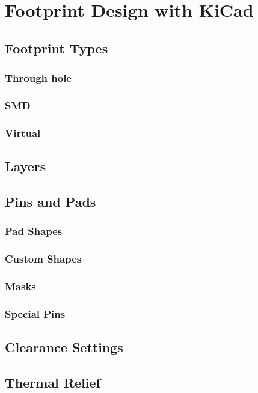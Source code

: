 
\chapter{Footprint Design with KiCad}

\section{Footprint Types}
\subsection{Through hole}
\subsection{SMD}
\subsection{Virtual}

\section{Layers}

\section{Pins and Pads}
\subsection{Pad Shapes}
\subsection{Custom Shapes}
\subsection{Masks}
\subsection{Special Pins}

\section{Clearance Settings}

\section{Thermal Relief}

